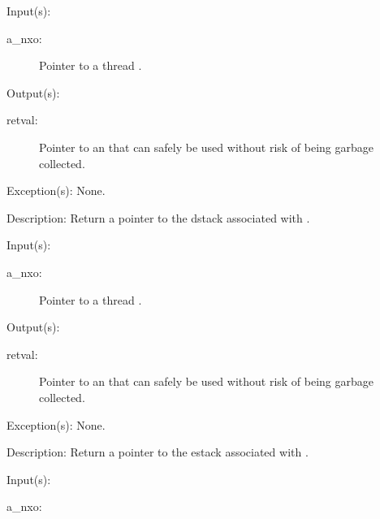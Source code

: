 \begin{capi}
	\begin{capilist}
	\item[Input(s): ]
		\begin{description}\item[]
		\item[a\_nxo: ]
			Pointer to a thread .
		\end{description}
	\item[Output(s): ]
		\begin{description}\item[]
		\item[retval: ]
			Pointer to an  that can safely be used
			without risk of being garbage collected.
		\end{description}
	\item[Exception(s): ] None.
	\item[Description: ]
		Return a pointer to the dstack associated with .
	\end{capilist}
\label{nxo_thread_estack_get}
	\begin{capilist}
	\item[Input(s): ]
		\begin{description}\item[]
		\item[a\_nxo: ]
			Pointer to a thread \classname{nxo}.
		\end{description}
	\item[Output(s): ]
		\begin{description}\item[]
		\item[retval: ]
			Pointer to an  that can safely be used
			without risk of being garbage collected.
		\end{description}
	\item[Exception(s): ] None.
	\item[Description: ]
		Return a pointer to the estack associated with \cvar{a\_nxo}.
	\end{capilist}
\label{nxo_thread_tstack_get}
	\begin{capilist}
	\item[Input(s): ]
		\begin{description}\item[]
		\item[a\_nxo: ]

\end{description}
\end{capilist}
\end{capi}
